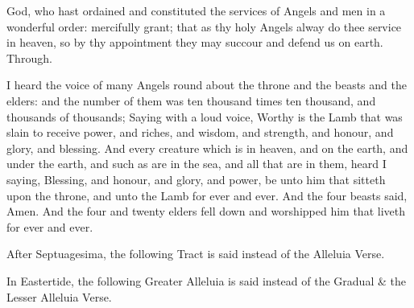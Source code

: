 \collect
{} God, who hast ordained and constituted the services of Angels and men in a wonderful order: mercifully grant; that as thy holy Angels alway do thee service in heaven, so by thy appointment they may succour and defend us on earth. Through.

 I heard the voice of many Angels round about the throne and the beasts and the elders: and the number of them was ten thousand times ten thousand, and thousands of thousands; Saying with a loud voice, Worthy is the Lamb that was slain to receive power, and riches, and wisdom, and strength, and honour, and glory, and blessing. And every creature which is in heaven, and on the earth, and under the earth, and such as are in the sea, and all that are in them, heard I saying, Blessing, and honour, and glory, and power, be unto him that sitteth upon the throne, and unto the Lamb for ever and ever. And the four beasts said, Amen. And the four and twenty elders fell down and worshipped him that liveth for ever and ever.


\clearpage
\begin{rubric}
    After Septuagesima, the following Tract is said instead of the Alleluia Verse.
\end{rubric}


\begin{rubric}
    In Eastertide, the following Greater Alleluia is said instead of the Gradual \& the Lesser Alleluia Verse.
\end{rubric}


